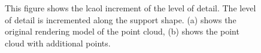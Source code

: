 \begin{figure}
\centering
{}
\caption[Example of the local increment of level of detail]
{This figure shows the lcaol increment of the level of detail. The level of detail is incremented along the support shape. (a) shows the original rendering model of the point cloud, (b) shows the point cloud with additional points. }
\label{fig:technologiezentrum_lod_increment}
\end{figure}


